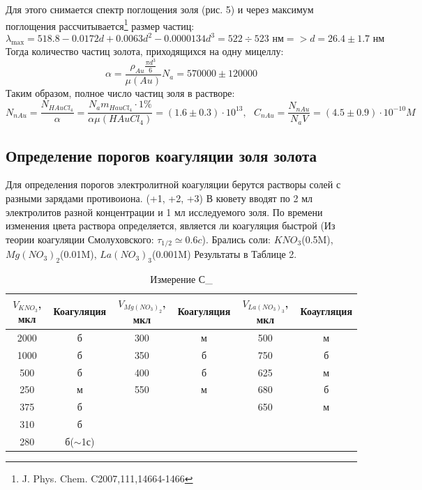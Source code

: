 \documentclass[a4paper, 12pt]{article}
\begin{document}
Для этого снимается спектр поглощения золя (рис. 5) и через максимум поглощения рассчитывается\footnote{J. Phys. Chem. C2007,111,14664-1466} размер частиц:
$$
\lambda_{\max }=518.8-0.0172 d+0.0063 d^{2}-0.0000134 d^{3}=522\div523\text{ нм} => d = 26.4 \pm 1.7\text{ нм}
$$
Тогда количество частиц золота, приходящихся на одну мицеллу:
$$
\alpha = \frac{\rho_{Au}\frac{\pi d^3}{6}}{\mu(Au)} N_{a}= 570  000 \pm 120 000
$$
Таким образом, полное число частиц золя в растворе:
$$
N_{nAu} = \frac{N_{HAuCl_{4}}}{\alpha}=\frac{N_{a}m_{HauCl_{4}}\cdot1\%}{\alpha\mu(HAuCl_{4})} = (1.6 \pm 0.3)\cdot 10^{13}, \text{ }
C_{nAu} = \frac{N_{nAu}}{N_{a}V} = (4.5 \pm 0.9)\cdot10^{-10} M
$$



\subsection{Определение порогов коагуляции золя золота}
Для определения порогов электролитной коагуляции берутся растворы солей с разными зарядами противоиона. (+1, +2, +3) В кювету вводят по 2 мл электролитов разной концентрации и 1 мл исследуемого золя. По времени изменения цвета раствора определяется, является ли коагуляция быстрой (Из теории коагуляции Смолуховского: $\tau_{1/2} \simeq 0.6c$). Брались соли: $KNO_{3}$(0.5M), $Mg(NO_{3})_{2}$(0.01M), $La(NO_{3})_{3}$(0.001M) Результаты в Таблице 2.

\begin{table}[h!]
\begin{center}
\caption{Измерение С_{}}
\begin{tabular}{|c|c|c|c|c|c|}
\hline
$V_{KNO_{3}}$, мкл & Коагуляция  &$V_{Mg(NO_{3})_{2}}$, мкл               & Коагуляция            & $V_{La(NO_{3})_{3}}$, мкл               & Коаугляция            \\ \hline
2000          & б           & 300                   & м                     & 500                   & м                     \\ \hline
1000          & б           & 350                   & б                     & 750                   & б                     \\ \hline
500           & б           & 400                   & б                     & 625                   & м                     \\ \hline
250           & м           & 550                   & м                     & 680                   & б                     \\ \hline
375           & б           & \multicolumn{1}{l|}{} & \multicolumn{1}{l|}{} & 650                   & м                     \\ \hline
310           & б           & \multicolumn{1}{l|}{} & \multicolumn{1}{l|}{} & \multicolumn{1}{l|}{} & \multicolumn{1}{l|}{} \\ \hline
280           & б($\sim$1с) & \multicolumn{1}{l|}{} & \multicolumn{1}{l|}{} & \multicolumn{1}{l|}{} & \multicolumn{1}{l|}{} \\ \hline
\end{tabular}
\end{center}
\end{table}
\end{document}
